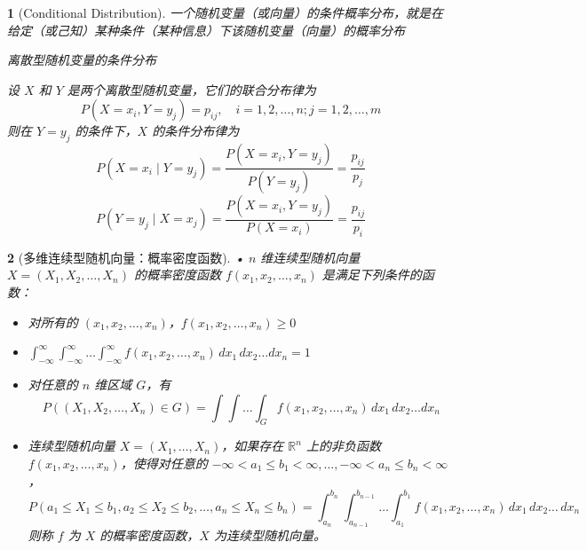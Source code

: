 \documentclass[UTF8]{report}
\theoremstyle{MyLineTheoremStyle} %
\theoremstyle{MyBlockTheoremStyle} %
\theoremstyle{MySubsubsectionStyle} %
\newtheorem{definition}{}
\begin{document}
\begin{definition}[Conditional Distribution]
    一个随机变量（或向量）的条件概率分布，就是在给定（或己知）某种条件（某种信息）下该随机变量（向量）的概率分布\par
离散型随机变量的条件分布\par

设 \(X\) 和 \(Y\) 是两个离散型随机变量，它们的联合分布律为
\[
P(X = x_i, Y = y_j) = p_{ij}, \quad i = 1, 2, \ldots, n; j = 1, 2, \ldots, m
\]
则在 \(Y = y_j\) 的条件下，\(X\) 的条件分布律为
\[
P(X = x_i \mid Y = y_j) = \frac{P(X = x_i, Y = y_j)}{P(Y = y_j)} = \frac{p_{ij}}{p_j}
\]
\[
P(Y = y_j \mid X = x_j) = \frac{P(X = x_i, Y = y_j)}{P(X = x_i)} = \frac{p_{ij}}{p_i}
\]
\end{definition}

\begin{definition}[多维连续型随机向量：概率密度函数]
    • \(n\) 维连续型随机向量 \(X = (X_1, X_2, \ldots, X_n)\) 的概率密度函数 \(f(x_1, x_2, \ldots, x_n)\) 是满足下列条件的函数：
    \begin{itemize}
        \item 对所有的 \((x_1, x_2, \ldots, x_n)\)，\(f(x_1, x_2, \ldots, x_n) \geq 0\)
        \item \(\int_{-\infty}^{\infty} \int_{-\infty}^{\infty} \ldots \int_{-\infty}^{\infty} f(x_1, x_2, \ldots, x_n) \, dx_1 \, dx_2 \ldots dx_n = 1\)
        \item 对任意的 \(n\) 维区域 \(G\)，有
        \[
        P((X_1, X_2, \ldots, X_n) \in G) = \int \int \ldots \int_G f(x_1, x_2, \ldots, x_n) \, dx_1 \, dx_2 \ldots dx_n
        \]
    \end{itemize}
    \begin{itemize}
        \item 连续型随机向量 \(X = (X_1, \dots, X_n)\)，如果存在 \(\mathbb{R}^n\) 上的非负函数 \(f(x_1, x_2, \dots, x_n)\)，使得对任意的 \(-\infty < a_1 \leq b_1 < \infty, \dots, -\infty < a_n \leq b_n < \infty\)，
        \[
        P(a_1 \leq X_1 \leq b_1, a_2 \leq X_2 \leq b_2, \dots, a_n \leq X_n \leq b_n) = \int_{a_n}^{b_n} \int_{a_{n-1}}^{b_{n-1}} \dots \int_{a_1}^{b_1} f(x_1, x_2, \dots, x_n) \, dx_1 \, dx_2 \dots \, dx_n
        \]
        则称 \(f\) 为 \(X\) 的概率密度函数，\(X\) 为连续型随机向量。
    \end{itemize}
    \end{definition}
\end{document}
